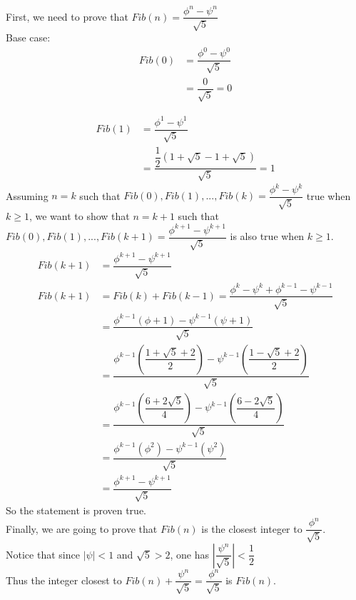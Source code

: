 \documentclass{article}
\begin{document}
\noindent
First, we need to prove that
${Fib}(n) = \dfrac{\phi^n-\psi^n}{\sqrt{5}}$
\\
Base case:
\begin{align}
  {Fib}(0) & = \dfrac{\phi^0-\psi^0}{\sqrt{5}} \\
           & = \dfrac{0}{\sqrt{5}} = 0
\end{align}

\begin{align}
  {Fib}(1) & = \dfrac{\phi^1-\psi^1}{\sqrt{5}} \\
           & = \dfrac{\dfrac{1}{2}\left(1+\sqrt{5} - 1 + \sqrt{5}\right)}{\sqrt{5}} = 1
\end{align}
Assuming ${n} = {k}$ such that ${Fib}(0), {Fib}(1), ..., {Fib}(k) = \dfrac{\phi^k-\psi^k}{\sqrt{5}}$
true when $k\geq1$, we want to show that ${n} = {k + 1}$ such that
\\
${Fib}(0), {Fib}(1), ..., {Fib}(k + 1) = \dfrac{\phi^{k+1}-\psi^{k+1}}{\sqrt{5}}$
is also true when $k\geq1$.
\\
\begin{align}
  {Fib}(k + 1) & = \dfrac{\phi^{k+1}-\psi^{k+1}}{\sqrt{5}} \\
  {Fib}(k + 1) & = {Fib}(k) + {Fib}(k - 1) = \dfrac{\phi^k-\psi^k + \phi^{k-1} - \psi^{k-1}}{\sqrt{5}} \\
               & = \dfrac{\phi^{k-1}(\phi + 1) - \psi^{k-1}(\psi + 1)}{\sqrt{5}} \\
               & = \dfrac{\phi^{k-1}(\dfrac{1 + \sqrt{5} + 2}{2}) - \psi^{k-1}(\dfrac{1 - \sqrt{5} + 2}{2})}{\sqrt{5}} \\
               & = \dfrac{\phi^{k-1}(\dfrac{6 + 2\sqrt{5}}{4}) - \psi^{k-1}(\dfrac{6 - 2\sqrt{5}}{4})}{\sqrt{5}} \\
               & = \dfrac{\phi^{k-1}(\phi^2) - \psi^{k-1}(\psi^2)}{\sqrt{5}} \\
               & = \dfrac{\phi^{k+1} - \psi^{k+1}}{\sqrt{5}}
\end{align}
So the statement is proven true.
\\
Finally, we are going to prove that $Fib(n)$ is the closest integer to $\dfrac{\phi^n}{\sqrt{5}}$.
\\
Notice that since $|\psi| < 1$ and $\sqrt{5} > 2$, one has $\left|\dfrac{\psi^n}{\sqrt{5}}\right| < \dfrac{1}{2}$
\\
Thus the integer closest to ${Fib}(n) + \dfrac{\psi^n}{\sqrt{5}} = \dfrac{\phi^n}{\sqrt{5}}$ is ${Fib}(n)$.
\end{document}
